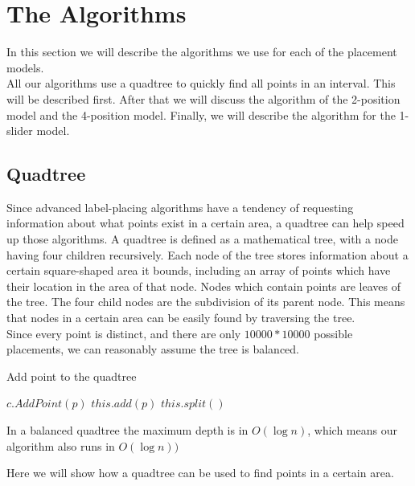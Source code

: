 \documentclass[crop=false,a4paper,oneside,11pt]{article}
\begin{document}
\section{The Algorithms}
In this section we will describe the algorithms we use for each of the placement models.\\
All our algorithms use a quadtree to quickly find all points in an interval. This will be described first. After that we will discuss the algorithm of the 2-position model and the 4-position model. Finally, we will describe the algorithm for the 1-slider model.

\subsection{Quadtree}

Since advanced label-placing algorithms have a tendency of requesting information about what points exist in a certain area, a quadtree can help speed up those algorithms. A quadtree is defined as a mathematical tree, with a node having four children recursively. Each node of the tree stores information about a certain square-shaped area it bounds, including an array of points which have their location in the area of that node. Nodes which contain points are leaves of the tree. The four child nodes are the subdivision of its parent node. This means that nodes in a certain area can be easily found by traversing the tree.\\
Since every point is distinct, and there are only $10000 * 10000$ possible placements, we can reasonably assume the tree is balanced.\\ %
\begin{algorithm}[H]
\caption{Add point to the quadtree}
\begin{algorithmic}[1]
\State $c.AddPoint(p)$
\EndIf
\EndFor
\Else{}
\State $this.add(p)$
\State $this.split()$ 
\EndIf
\EndIf
\EndProcedure
\end{algorithmic}
\end{algorithm}
In a balanced quadtree the maximum depth is in $O(\log{n})$, which means our algorithm also runs in $O(\log{n}))$

Here we will show how a quadtree can be used to find points in a certain area.\\
\end{document}
